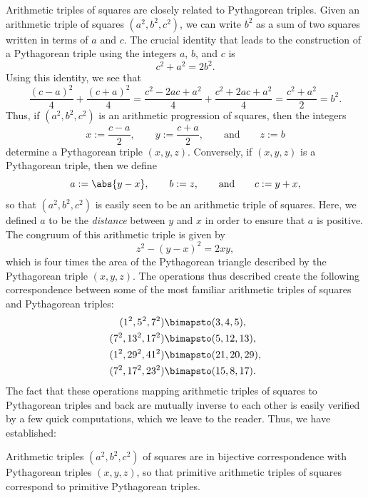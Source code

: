 Arithmetic triples of squares are closely related to Pythagorean triples. Given an arithmetic triple of squares $(a^2,b^2,c^2)$, we can write $b^2$ as a sum of two squares written in terms of $a$ and $c$. The crucial identity that leads to the construction of a Pythagorean triple using the integers $a$, $b$, and $c$ is
\begin{equation*}
  c^2+a^2=2b^2.
\end{equation*}
Using this identity, we see that
\begin{equation*}
  \frac{(c-a)^2}{4}+\frac{(c+a)^2}{4}= \frac{c^2-2ac+a^2}{4}+\frac{c^2+2ac+a^2}{4} = \frac{c^2+ a^2}{2} = b^2.
\end{equation*}
Thus, if $(a^2,b^2,c^2)$ is an arithmetic progression of squares, then the integers
\begin{equation*}
  x := \frac{c-a}{2},\qquad y:= \frac{c+a}{2},\qquad\text{and}\qquad z:= b
\end{equation*}
determine a Pythagorean triple $(x,y,z)$. Conversely, if $(x,y,z)$ is a Pythagorean triple, then we define
\begin{equation*}
  a := \abs{y-x}, \qquad b := z,\qquad\text{and}\qquad c:= y+x,
\end{equation*}
so that $(a^2,b^2,c^2)$ is easily seen to be an arithmetic triple of squares. Here, we defined $a$ to be the \emph{distance} between $y$ and $x$ in order to ensure that $a$ is positive. The congruum of this arithmetic triple is given by
\begin{equation*}
  z^2-(y-x)^2=2xy,
\end{equation*}
which is four times the area of the Pythagorean triangle described by the Pythagorean triple $(x,y,z)$.
The operations thus described create the following correspondence between some of the most familiar arithmetic triples of squares and Pythagorean triples:
\begin{align*}
  (1^2,5^2,7^2)   & \bimapsto (3,4,5), \\
  (7^2,13^2,17^2) & \bimapsto (5,12,13), \\
  (1^2,29^2,41^2) & \bimapsto (21,20,29), \\
  (7^2,17^2,23^2) & \bimapsto (15,8,17).
\end{align*}
The fact that these operations mapping arithmetic triples of squares to Pythagorean triples and back are mutually inverse to each other is easily verified by a few quick computations, which we leave to the reader. Thus, we have established:

\begin{theorem}\label{theorem:correspondence-arithmetic-triples-squares}
  Arithmetic triples $(a^2,b^2,c^2)$ of squares are in bijective correspondence with Pythagorean triples $(x,y,z)$, so that primitive arithmetic triples of squares correspond to primitive Pythagorean triples.
\end{theorem}


